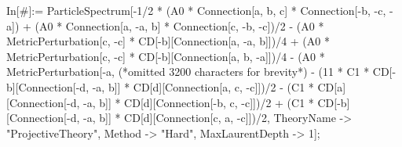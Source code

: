In[\#]:= ParticleSpectrum[-1/2 * (A0 * Connection[a, b, c] * Connection[-b, -c, -a]) + (A0 * Connection[a, -a, b] * Connection[c, -b, -c])/2 - (A0 * MetricPerturbation[c, -c] * CD[-b][Connection[a, -a, b]])/4 + (A0 * MetricPerturbation[c, -c] * CD[-b][Connection[a, b, -a]])/4 - (A0 * MetricPerturbation[-a, (*omitted 3200 characters for brevity*) - (11 * C1 * CD[-b][Connection[-d, -a, b]] * CD[d][Connection[a, c, -c]])/2 - (C1 * CD[a][Connection[-d, -a, b]] * CD[d][Connection[-b, c, -c]])/2 + (C1 * CD[-b][Connection[-d, -a, b]] * CD[d][Connection[c, a, -c]])/2, TheoryName -> "ProjectiveTheory", Method -> "Hard", MaxLaurentDepth -> 1];